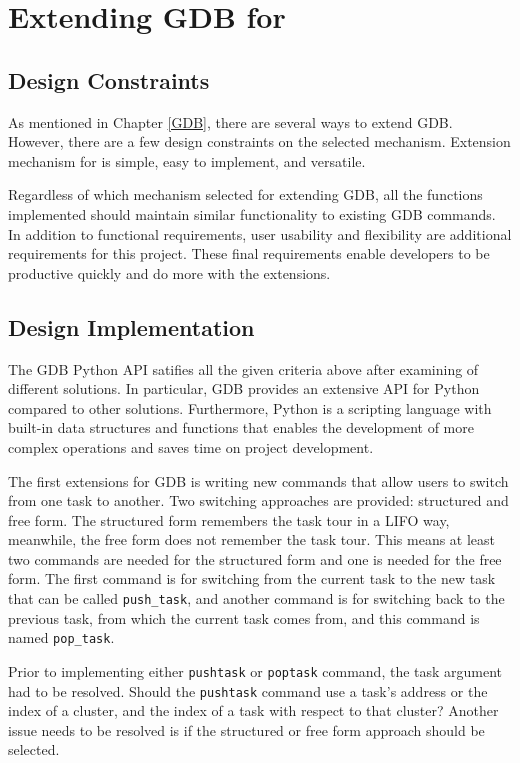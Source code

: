 \chapter{Extending GDB for \uCPP}
\section{Design Constraints}
As mentioned in Chapter \ref{GDB}, there are several ways to extend GDB. However,
there are a few design constraints on the selected mechanism. Extension
mechanism for \uCPPS is simple, easy to implement, and versatile.

Regardless of which mechanism selected for extending GDB, all the functions
implemented should maintain similar functionality to existing GDB commands. In addition to functional
requirements, user usability and flexibility are additional requirements for this
project. These final requirements enable developers to be productive quickly
and do more with the extensions.

\section{}

\section{Design Implementation}
The GDB Python API satifies all the given criteria above after examining of different solutions. In particular, GDB provides an extensive API for
Python compared to other solutions. Furthermore, Python is a scripting language with built-in
data structures and functions that enables the development of more complex
operations and saves time on project development.

The first extensions for GDB is writing new commands that allow
users to switch from one \uCCS task to another. Two switching approaches are
provided: structured and free form. The structured form remembers the task tour in a
LIFO way, meanwhile, the free form does not remember the task tour. This means
at least two commands are needed for the structured form and one is needed for
the free form. The first command is for switching from the current task to
the new task that can be called \verb|push_task|, and another command
is for switching back to the previous task, from which the current task comes
from, and this command is named \verb|pop_task|.

Prior to implementing either \verb|pushtask| or \verb|poptask| command, the
task argument had to be resolved. Should the \verb|pushtask| command use a task's address or the index of a cluster, and the index of a task with respect
to that cluster? Another issue needs to be resolved is if the structured or free
form approach should be selected.

